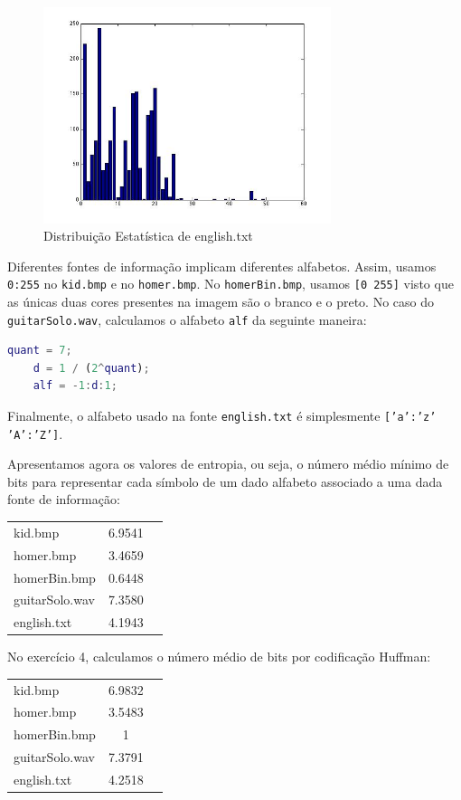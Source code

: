 \documentclass[12pt]{article}
\begin{document}
  \begin{figure}[H]
    \centering
      \includegraphics[width=0.75\textwidth]{ex3english}
    \caption{Distribuição Estatística de english.txt}
  \end{figure}

  Diferentes fontes de informação implicam diferentes alfabetos. Assim, usamos
  \texttt{0:255} no \texttt{kid.bmp} e no \texttt{homer.bmp}. No \texttt{homerBin.bmp},
  usamos \texttt{[0 255]} visto que as únicas duas cores presentes na imagem
  são o branco e o preto. No caso do \texttt{guitarSolo.wav}, calculamos o alfabeto
  \texttt{alf} da seguinte maneira:

  \vspace{2mm}
  \begin{lstlisting}[language=Matlab]
    quant = 7;
    d = 1 / (2^quant);
    alf = -1:d:1;
  \end{lstlisting}

  Finalmente, o alfabeto usado na fonte \texttt{english.txt} é simplesmente
  \texttt{['a':'z' 'A':'Z']}.

  Apresentamos agora os valores de entropia, ou seja, o número médio mínimo
  de bits para representar cada símbolo de um dado alfabeto associado a uma
  dada fonte de informação:

  \begin{tabular}{ l c r }
    kid.bmp & 6.9541 \\
    homer.bmp & 3.4659 \\
    homerBin.bmp & 0.6448 \\
    guitarSolo.wav & 7.3580 \\
    english.txt & 4.1943 \\
  \end{tabular}

  \pagebreak

  No exercício 4, calculamos o número médio de bits por codificação Huffman:

  \begin{tabular}{ l c r }
    kid.bmp & 6.9832 \\
    homer.bmp & 3.5483 \\
    homerBin.bmp & 1 \\
    guitarSolo.wav & 7.3791 \\
    english.txt & 4.2518 \\
  \end{tabular}
\end{document}
